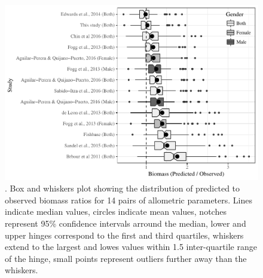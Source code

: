 \documentclass[12pt,]{article}
\begin{document}
\clearpage

\begin{figure}[htbp]
\centering
\includegraphics{Manuscript_files/figure-latex/unnamed-chunk-10-1.pdf}
\caption{. Box and whiskers plot showing the distribution of predicted
to observed biomass ratios for 14 pairs of allometric parameters. Lines
indicate median values, circles indicate mean values, notches represent
95\% confidence intervals arround the median, lower and upper hinges
correspond to the first and third quartiles, whiskers extend to the
largest and lowes values within 1.5 inter-quartile range of the hinge,
small points represent outliers further away than the whiskers.}
\end{figure}
\end{document}
